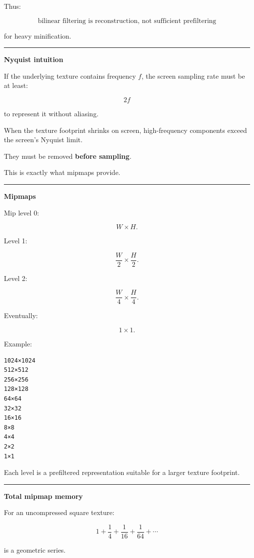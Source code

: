 Thus:

\[
\boxed{\text{bilinear filtering is reconstruction, not sufficient prefiltering}}
\]

for heavy minification.

\begin{center}\rule{0.5\linewidth}{0.5pt}\end{center}

\textbf{Nyquist intuition}

If the underlying texture contains frequency \(f\), the screen sampling rate must be at least:

\[
2f
\]

to represent it without aliasing.

When the texture footprint shrinks on screen, high-frequency components exceed the screen's Nyquist limit.

They must be removed \textbf{before sampling}.

This is exactly what mipmaps provide.

\begin{center}\rule{0.5\linewidth}{0.5pt}\end{center}

\textbf{Mipmaps}

Mip level 0:

\[
W\times H.
\]

Level 1:

\[
\frac W2\times\frac H2.
\]

Level 2:

\[
\frac W4\times\frac H4.
\]

Eventually:

\[
1\times1.
\]

Example:

\begin{verbatim}
1024×1024
512×512
256×256
128×128
64×64
32×32
16×16
8×8
4×4
2×2
1×1
\end{verbatim}

Each level is a prefiltered representation suitable for a larger texture footprint.

\begin{center}\rule{0.5\linewidth}{0.5pt}\end{center}

\textbf{Total mipmap memory}

For an uncompressed square texture:

\[
1+\frac14+\frac1{16}+\frac1{64}+\cdots
\]

is a geometric series.

